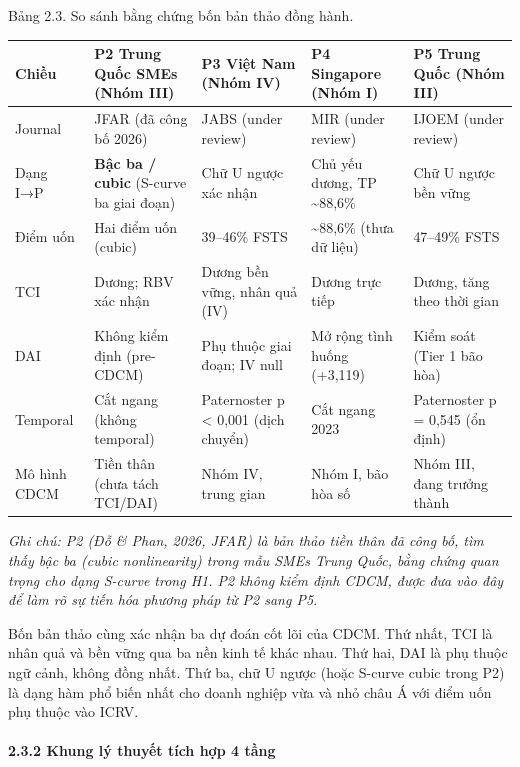 \documentclass[12pt,a4paper]{article}
\begin{document}
Bảng 2.3. So sánh bằng chứng bốn bản thảo đồng hành.

\begin{longtable}[]{@{}lllll@{}}
\toprule\noalign{}
Chiều & P2 Trung Quốc SMEs (Nhóm III) & P3 Việt Nam (Nhóm IV) & P4
Singapore (Nhóm I) & P5 Trung Quốc (Nhóm III) \\
\midrule\noalign{}
\endhead
\bottomrule\noalign{}
\endlastfoot
Journal & JFAR (đã công bố 2026) & JABS (under review) & MIR (under
review) & IJOEM (under review) \\
Dạng I→P & \textbf{Bậc ba / cubic} (S-curve ba giai đoạn) & Chữ U ngược
xác nhận & Chủ yếu dương, TP \textasciitilde88,6\% & Chữ U ngược bền
vững \\
Điểm uốn & Hai điểm uốn (cubic) & 39--46\% FSTS & \textasciitilde88,6\%
(thưa dữ liệu) & 47--49\% FSTS \\
TCI & Dương; RBV xác nhận & Dương bền vững, nhân quả (IV) & Dương trực
tiếp & Dương, tăng theo thời gian \\
DAI & Không kiểm định (pre-CDCM) & Phụ thuộc giai đoạn; IV null & Mở
rộng tình huống (+3,119) & Kiểm soát (Tier 1 bão hòa) \\
Temporal & Cắt ngang (không temporal) & Paternoster p \textless{} 0,001
(dịch chuyển) & Cắt ngang 2023 & Paternoster p = 0,545 (ổn định) \\
Mô hình CDCM & Tiền thân (chưa tách TCI/DAI) & Nhóm IV, trung gian &
Nhóm I, bão hòa số & Nhóm III, đang trưởng thành \\
\end{longtable}

\emph{Ghi chú: P2 (Đỗ \& Phan, 2026, JFAR) là bản thảo tiền thân đã công
bố, tìm thấy bậc ba (cubic nonlinearity) trong mẫu SMEs Trung Quốc, bằng
chứng quan trọng cho dạng S-curve trong H1. P2 không kiểm định CDCM,
được đưa vào đây để làm rõ sự tiến hóa phương pháp từ P2 sang P5.}

Bốn bản thảo cùng xác nhận ba dự đoán cốt lõi của CDCM. Thứ nhất, TCI là
nhân quả và bền vững qua ba nền kinh tế khác nhau. Thứ hai, DAI là phụ
thuộc ngữ cảnh, không đồng nhất. Thứ ba, chữ U ngược (hoặc S-curve cubic
trong P2) là dạng hàm phổ biến nhất cho doanh nghiệp vừa và nhỏ châu Á
với điểm uốn phụ thuộc vào ICRV.

\hypertarget{232-khung-luxfd-thuyux1ebft-tuxedch-hux1ee3p-4-tux1ea7ng}{%
\paragraph{2.3.2 Khung lý thuyết tích hợp 4
tầng}\label{232-khung-luxfd-thuyux1ebft-tuxedch-hux1ee3p-4-tux1ea7ng}}
\end{document}
